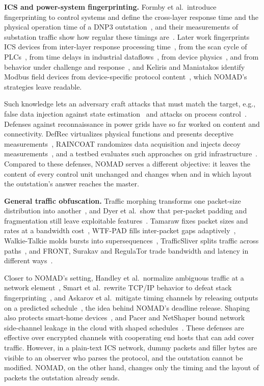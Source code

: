 \documentclass[conference]{IEEEtran}
\begin{document}
\textbf{ICS and power-system fingerprinting.} Formby et al.\ introduce fingerprinting to control systems and define the cross-layer response time and the physical operation time of a DNP3 outstation~\cite{formby2016}, and their measurements of substation traffic show how regular these timings are~\cite{formby2017}. Later work fingerprints ICS devices from inter-layer response processing time~\cite{shen2018}, from the scan cycle of PLCs~\cite{ahmed2021}, from time delays in industrial dataflows~\cite{pospisil2023}, from device physics~\cite{gu2018}, and from behavior under challenge and response~\cite{babun2021}, and Keliris and Maniatakos identify Modbus field devices from device-specific protocol content~\cite{keliris2016}, which NOMAD's strategies leave readable.

Such knowledge lets an adversary craft attacks that must match the target, e.g., false data injection against state estimation~\cite{liufdia2009} and attacks on process control~\cite{cardenas2011}. Defenses against reconnaissance in power grids have so far worked on content and connectivity. DefRec virtualizes physical functions and presents deceptive measurements~\cite{defrec2020}, RAINCOAT randomizes data acquisition and injects decoy measurements~\cite{raincoat2019}, and a testbed evaluates such approaches on grid infrastructure~\cite{lintestbed2020}. Compared to these defenses, NOMAD serves a different objective: it leaves the content of every control unit unchanged and changes when and in which layout the outstation's answer reaches the master.

\textbf{General traffic obfuscation.} Traffic morphing transforms one packet-size distribution into another~\cite{wright2009}, and Dyer et al.\ show that per-packet padding and fragmentation still leave exploitable features~\cite{dyer2012}. Tamaraw fixes packet sizes and rates at a bandwidth cost~\cite{tamaraw2014}, WTF-PAD fills inter-packet gaps adaptively~\cite{juarez2016}, Walkie-Talkie molds bursts into supersequences~\cite{walkietalkie2017}, TrafficSliver splits traffic across paths~\cite{trafficsliver2020}, and FRONT, Surakav and RegulaTor trade bandwidth and latency in different ways~\cite{front2020,surakav2022,regulator2022}.

Closer to NOMAD's setting, Handley et al.\ normalize ambiguous traffic at a network element~\cite{normalization2001}, Smart et al.\ rewrite TCP/IP behavior to defeat stack fingerprinting~\cite{smart2000}, and Askarov et al.\ mitigate timing channels by releasing outputs on a predicted schedule~\cite{askarov2010}, the idea behind NOMAD's deadline release. Shaping also protects smart-home devices~\cite{apthorpe2019}, and Pacer and NetShaper bound network side-channel leakage in the cloud with shaped schedules~\cite{pacer2022,netshaper2024}. These defenses are effective over encrypted channels with cooperating end hosts that can add cover traffic. However, in a plain-text ICS network, dummy packets and filler bytes are visible to an observer who parses the protocol, and the outstation cannot be modified. NOMAD, on the other hand, changes only the timing and the layout of packets the outstation already sends.
\end{document}
